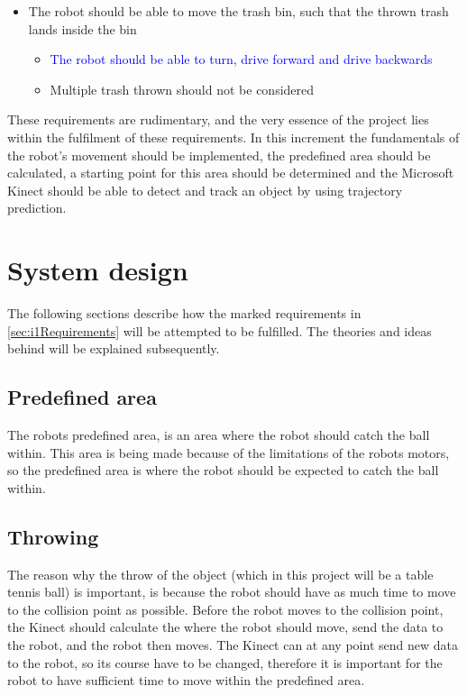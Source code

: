 \begin{itemize}
\begin{itemize}
\end{itemize}
\item The robot should be able to move the trash bin, such that the thrown trash lands inside the bin
\begin{itemize}
\item \textcolor{blue}{The robot should be able to turn, drive forward and drive backwards}
\item Multiple trash thrown should not be considered
\end{itemize}
\end{itemize}

These requirements are rudimentary, and the very essence of the project lies within the fulfilment of these requirements. In this increment the fundamentals of the robot’s movement should be implemented, the predefined area should be calculated, a starting point for this area should be determined and the Microsoft Kinect should be able to detect and track an object by using trajectory prediction.

\section{System design}
\label{sec:i1System Design}
The following sections describe how the marked requirements in \ref{sec:i1Requirements} will be attempted to be fulfilled. The theories and ideas behind will be explained subsequently.

\subsection{Predefined area}
\label{sec:i1Predefined area}
The robots predefined area, is an area where the robot should catch the ball within. This area is being made because of the limitations of the robots motors, so the predefined area is where the robot should be expected to catch the ball within.

\subsection{Throwing}
\label{sec:i1Throwing}
The reason why the throw of the object (which in this project will be a table tennis ball) is important, is because the robot should have as much time to move to the collision point as possible. Before the robot moves to the collision point, the Kinect should calculate the where the robot should move, send the data to the robot, and the robot then moves. The Kinect can at any point send new data to the robot, so its course have to be changed, therefore it is important for the robot to have sufficient time to move within the predefined area.    

